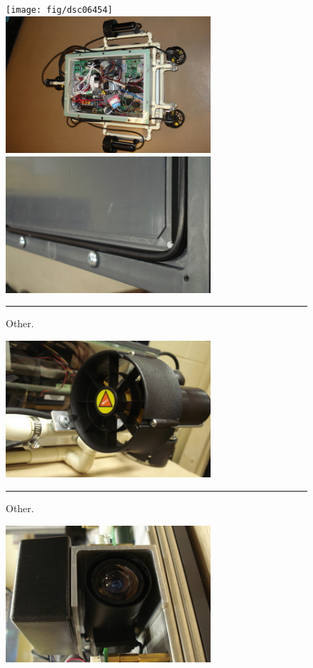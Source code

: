 {\begin{figure}[h]
\begin{center}
 \texttt{[image: fig/dsc06454]} 
 \includegraphics[width=3in]{fig/dsc06456} 
 \includegraphics[width=3in]{fig/dsc06461} 
\vspace{.05in}
\hrule
\caption{Other.}\label{oring}
\end{center}
\end{figure}
\begin{figure}[h]
\begin{center}
 \includegraphics[width=3in]{fig/dsc06463} 
\vspace{.05in}
\hrule
\caption{Other.}\label{oring}
\end{center}
\end{figure}
\begin{figure}[h]
\begin{center}
 \includegraphics[width=3in]{fig/dsc06467} 

\end{center}
\end{figure}}
